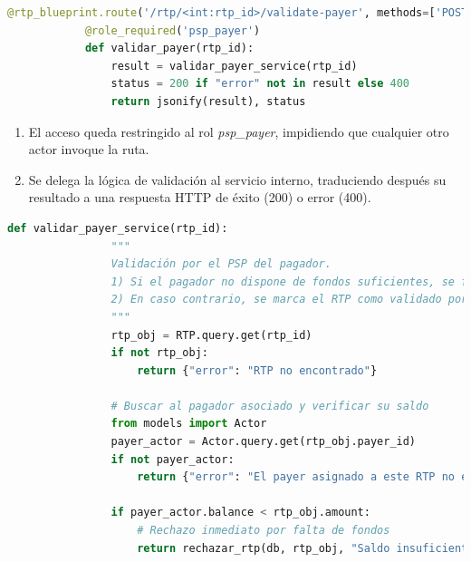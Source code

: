 \begin{itemize}
       \begin{lstlisting}[language=Python, style=custom]
            @rtp_blueprint.route('/rtp/<int:rtp_id>/validate-payer', methods=['POST'])
            @role_required('psp_payer')
            def validar_payer(rtp_id):
                result = validar_payer_service(rtp_id)
                status = 200 if "error" not in result else 400
                return jsonify(result), status
        \end{lstlisting}

        \begin{enumerate}
          \item El acceso queda restringido al rol \emph{psp\_payer}, impidiendo que
                cualquier otro actor invoque la ruta.
          \item Se delega la lógica de validación al servicio interno,
                traduciendo después su resultado a una respuesta HTTP de éxito
                (200) o error (400).
        \end{enumerate}
        \vspace{0.8em}

       \begin{lstlisting}[language=Python, style=custom]
            def validar_payer_service(rtp_id):
                """
                Validación por el PSP del pagador.
                1) Si el pagador no dispone de fondos suficientes, se fuerza el rechazo.
                2) En caso contrario, se marca el RTP como validado por el PSP del pagador.
                """
                rtp_obj = RTP.query.get(rtp_id)
                if not rtp_obj:
                    return {"error": "RTP no encontrado"}

                # Buscar al pagador asociado y verificar su saldo
                from models import Actor
                payer_actor = Actor.query.get(rtp_obj.payer_id)
                if not payer_actor:
                    return {"error": "El payer asignado a este RTP no existe"}

                if payer_actor.balance < rtp_obj.amount:
                    # Rechazo inmediato por falta de fondos
                    return rechazar_rtp(db, rtp_obj, "Saldo insuficiente (PSP forzó cancelación)")


\end{lstlisting}
\end{itemize}
